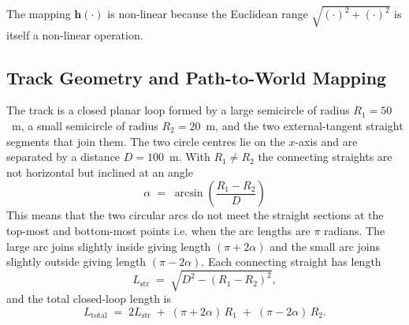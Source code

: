 The mapping $\mathbf{h}(\cdot)$ is non-linear because the Euclidean range $\sqrt{(\cdot)^{2} + (\cdot)^{2}}$ is itself a non-linear operation.

\subsection{Track Geometry and Path-to-World Mapping}
\label{subsec:track}

The track is a closed planar loop formed by a large semicircle of radius $R_1=50$~m, a small semicircle of radius $R_2=20$~m, and the two external-tangent straight segments that join them. The two circle centres lie on the $x$-axis and are separated by a distance $D=100$~m. With $R_1\neq R_2$ the connecting straights are not horizontal but inclined at an angle
\begin{equation}
    \alpha \;=\; \arcsin\!\left(\frac{R_1 - R_2}{D}\right)
    \label{eq:alpha}
\end{equation}
This means that the two circular arcs do not meet the straight sections at the top-most and bottom-most points i.e. when the arc lengths are $\pi$ radians. The large arc joins slightly inside giving length $(\pi+2\alpha)$ and the small arc joins slightly outside giving length $(\pi-2\alpha)$. Each connecting straight has length
\begin{equation}
    L_{\text{str}} \;=\; \sqrt{D^{2} - (R_1 - R_2)^{2}},
\end{equation}
and the total closed-loop length is
\begin{equation}
    L_{\text{total}} \;=\; 2 L_{\text{str}} \;+\; (\pi + 2\alpha)\,R_1 \;+\; (\pi - 2\alpha)\,R_2.
\end{equation}

